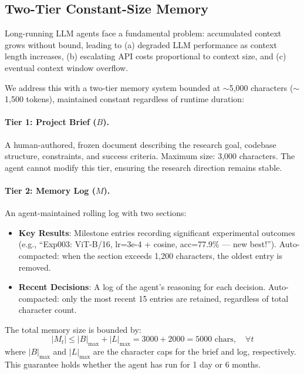 \subsection{Two-Tier Constant-Size Memory}
\label{sec:memory}

Long-running LLM agents face a fundamental problem: accumulated context grows without bound, leading to (a) degraded LLM performance as context length increases, (b) escalating API costs proportional to context size, and (c) eventual context window overflow.

We address this with a two-tier memory system bounded at $\sim$5,000 characters ($\sim$1,500 tokens), maintained constant regardless of runtime duration:

\paragraph{Tier 1: Project Brief ($B$).} A human-authored, frozen document describing the research goal, codebase structure, constraints, and success criteria. Maximum size: 3,000 characters. The agent cannot modify this tier, ensuring the research direction remains stable.

\paragraph{Tier 2: Memory Log ($M$).} An agent-maintained rolling log with two sections:
\begin{itemize}[nosep]
    \item \textbf{Key Results}: Milestone entries recording significant experimental outcomes (e.g., ``Exp003: ViT-B/16, lr=3e-4 + cosine, acc=77.9\% --- new best!''). Auto-compacted: when the section exceeds 1,200 characters, the oldest entry is removed.
    \item \textbf{Recent Decisions}: A log of the agent's reasoning for each decision. Auto-compacted: only the most recent 15 entries are retained, regardless of total character count.
\end{itemize}

The total memory size is bounded by:
\begin{equation}
    |M_t| \leq |B|_{\max} + |L|_{\max} = 3000 + 2000 = 5000 \text{ chars}, \quad \forall t
\end{equation}
where $|B|_{\max}$ and $|L|_{\max}$ are the character caps for the brief and log, respectively. This guarantee holds whether the agent has run for 1 day or 6 months.

